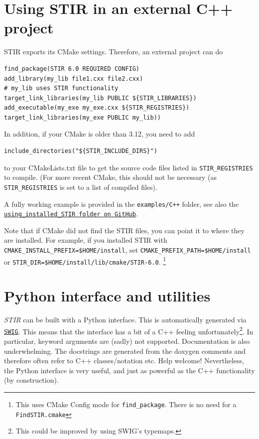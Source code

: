 \documentclass{article}
\def\url#1#2{\mbox{\href{#1}{\tt #2}}}
\begin{document}
{{{{{{\section{Using STIR in an external C++ project
\label{sec:ExternalProjectC++}}
STIR exports its CMake settings. Therefore, an external project can do
\begin{verbatim}
find_package(STIR 6.0 REQUIRED CONFIG)
add_library(my_lib file1.cxx file2.cxx)
# my_lib uses STIR functionality
target_link_libraries(my_lib PUBLIC ${STIR_LIBRARIES})
add_executable(my_exe my_exe.cxx ${STIR_REGISTRIES})
target_link_libraries(my_exe PUBLIC my_lib))
\end{verbatim}
In addition, if your CMake is older than 3.12, you need to add
\begin{verbatim}
include_directories("${STIR_INCLUDE_DIRS}")
\end{verbatim}
to your CMakeLists.txt file to get the source code files listed in \texttt{STIR\_REGISTRIES} to compile.
(For more recent CMake, this should not be necessary (as \texttt{STIR\_REGISTRIES} is set to
a list of compiled files).

A fully working example is provided in the \texttt{examples/C++} folder, see also the
\url{https://github.com/UCL/STIR/tree/master/examples/C\%2B\%2B/using_installed_STIR}{using\_installed\_STIR folder on GitHub}.

Note that if CMake did not find the STIR files, you can point it to where they are installed.
For example, if you installed STIR with
\texttt{CMAKE\_INSTALL\_PREFIX=\$HOME/install}, set
\texttt{CMAKE\_PREFIX\_PATH=\$HOME/install} or \texttt{STIR\_DIR=\$HOME/install/lib/cmake/STIR-6.0}.
\footnote{This uses CMake Config mode for \texttt{find\_package}. There is no need for a \texttt{FindSTIR.cmake}}

\section{
  Python interface and utilities}

  \textit{STIR} can be built with a Python interface. This is automatically generated via
  \url{https://swig.org/}{SWIG}. This means that the interface has a bit of a C++ feeling
  unfortunately\footnote{This could be improved by using SWIG's typemaps.}. In particular, keyword arguments are (sadly) not supported. Documentation
  is also underwhelming. The docstrings are generated from the doxygen comments and therefore
  often refer to C++ classes/notation etc. Help welcome! Nevertheless, the Python interface
  is very useful, and just as powerful as the C++ functionality (by construction).

}}}}}}
\end{document}

